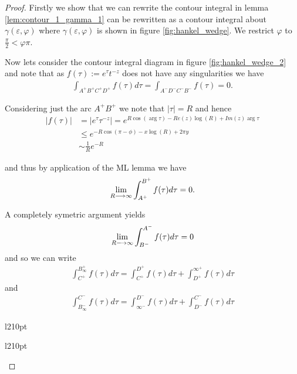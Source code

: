 \begin{proof}

Firstly we show that we can rewrite the contour integral in lemma \ref{lem:contour_1_gamma_1} can be rewritten as a contour
integral about $ \gamma(\varepsilon, \varphi) $ where $ \gamma(\varepsilon, \varphi) $ is shown in figure \ref{fig:hankel_wedge}. We restrict $ \varphi $ to $ \frac{\pi}{2} < \varphi \pi $. 

Now lets consider the contour integral diagram in figure \ref{fig:hankel_wedge_2} and note that as $ f(\tau) := e^\tau t^{-z} $ does not have any singularities we have
\begin{align*}
    \int_{A^+ B^+ C^+ D^+} f(\tau) d\tau = \int_{A^-D^-C^-B^-} f(\tau) = 0.
\end{align*}

Considering just the arc $ A^+B^+ $ we note that $ |\tau| = R $ and hence
\begin{align*}
    |f(\tau)| &= |e^\tau \tau^{-z}| = e^{R\cos(\arg \tau) - Re(z) \log(R) + Im(z) \arg \tau} \\
      &\leq e^{-R\cos(\pi - \phi) - x \log(R) + 2 \pi y} \\
      &\sim \frac{1}{R}e^{-R}
\end{align*}

and thus by application of the ML lemma we have
\begin{align*}
    \lim_{R \longrightarrow \infty} \int_{A^+}^{B^+} f(\tau) d\tau = 0.
\end{align*}

A completely symetric argument yields
\begin{align*}
    \lim_{R \longrightarrow \infty} \int_{B^-}^{A^-} f(\tau) d\tau = 0
\end{align*}
and so we can write
\begin{align*}
    \int_{C^+}^{B_\infty^+} f(\tau)d\tau = \int_{C^+}^{D^+} f(\tau)d\tau + \int_{D^+}^{\infty^+} f(\tau)d\tau
\end{align*}
and
\begin{align*}
    \int_{B_\infty^-}^{C^-} f(\tau)d\tau = \int_{\infty^-}^{D^-} f(\tau)d\tau + \int_{D^-}^{C^-} f(\tau)d\tau
\end{align*}
\begin{wrapfigure}{l}{210pt}
    
    \caption{The Hankel countour $ \gamma(\varepsilon, \varphi) $}
    \label{fig:hankel_wedge}
\end{wrapfigure}

\begin{wrapfigure}{l}{210pt}
    
    \caption{ Integration contour for $ \gamma(\varepsilon, \varphi) $}
    \label{fig:hankel_wedge_2}
\end{wrapfigure}
\end{proof}

